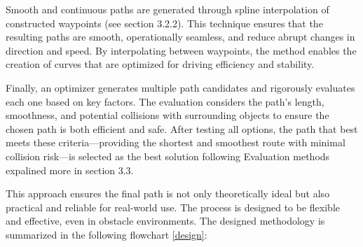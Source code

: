Smooth and continuous paths are generated through spline interpolation of constructed waypoints (see section 3.2.2). 
This technique ensures 
that the resulting paths are smooth, operationally seamless, and reduce abrupt changes in direction and speed. 
By interpolating between waypoints, the method enables the creation of curves that are optimized for driving efficiency 
and stability.

Finally, an optimizer  
generates multiple path candidates and rigorously evaluates each one based on key factors. 
The evaluation considers the path's length, smoothness, and potential collisions with surrounding objects to ensure the 
chosen path is both efficient and safe. After testing all options, the path that best meets these 
criteria—providing the shortest and smoothest route with minimal collision risk—is selected as the best solution
following Evaluation methods expalined more in section 3.3. 

This approach ensures the final path is not only theoretically ideal but also practical and reliable for real-world use. 
The process is designed to be flexible and effective, even in obstacle environments. The designed methodology 
is summarized in the following flowchart \ref{design}:

